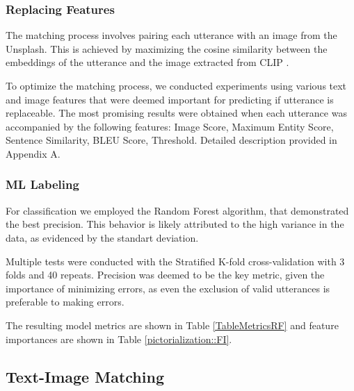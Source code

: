 \documentclass[11pt]{article}
\begin{document}
\subsubsection{Replacing Features}

The matching process involves pairing each utterance with an image from the Unsplash. This is achieved by maximizing the cosine similarity between the embeddings of the utterance and the image extracted from CLIP \cite{Radford-2021}. 

\smallskip

To optimize the matching process, we conducted experiments using various text and image features that were deemed important for predicting if utterance is replaceable. The most promising results were obtained when each utterance was accompanied by the following features: Image Score, Maximum Entity Score, Sentence Similarity, BLEU Score, Threshold. Detailed description provided in Appendix A.


\smallskip




\subsubsection{ML Labeling}

For classification we employed the Random Forest algorithm, that demonstrated the best precision\cite{scikit-learn}. This behavior is likely attributed to the high variance in the data, as evidenced by the standart deviation.

Multiple tests were conducted with the Stratified K-fold cross-validation with 3 folds and 40 repeats. Precision was deemed to be the key metric, given the importance of minimizing errors, as even the exclusion of valid utterances is preferable to making errors.

\smallskip

The resulting model metrics are shown in Table \ref{TableMetricsRF} and feature importances are shown in Table \ref{pictorialization::FI}. 









\subsection{Text-Image Matching}
\end{document}
